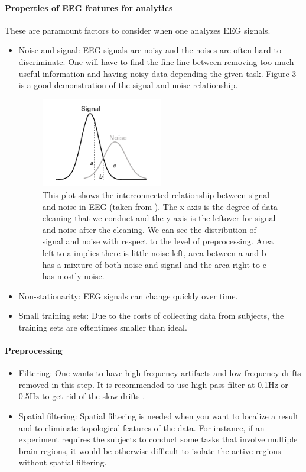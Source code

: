 \documentclass[a4paper,11pt,oneside]{article}
\begin{document}
\paragraph{Properties of EEG features for analytics} 
These are paramount factors to consider when one analyzes EEG signals.
\begin{itemize}
	\item Noise and signal: EEG signals are noisy and the noises are often hard to discriminate. One will have to find the fine line between removing too much useful information and having noisy data depending the given task. Figure 3 is a good demonstration of the signal and noise relationship.
	\begin{figure}[h]
		\centering
		\includegraphics[width=0.5\textwidth]{img/noise}
		\caption{This plot shows the interconnected relationship between signal and noise in EEG (taken from \cite{cohen2014analyzing}). The x-axis is the degree of data cleaning that we conduct and the y-axis is the leftover for signal and noise after the cleaning. We can see the distribution of signal and noise with respect to the level of preprocessing. Area left to a implies there is little noise left, area between a and b has a mixture of both noise and signal and the area right to c has mostly noise.}
	\end{figure}
	\item Non-stationarity: EEG signals can change quickly over time.
	\item Small training sets: Due to the costs of collecting data from subjects, the training sets are oftentimes 
	smaller than ideal.
\end{itemize}

\paragraph{Preprocessing}
\begin{itemize}
	\item Filtering: One wants to have high-frequency artifacts and low-frequency drifts removed in this step.
	It is recommended to use high-pass filter at 0.1Hz or 0.5Hz to get rid of the slow drifts \cite{cohen2014analyzing}.
	\item Spatial filtering: Spatial filtering is needed when you want to localize a result and to eliminate topological features of the data. For instance, if an experiment requires the subjects to conduct some tasks that involve multiple brain regions, it would be otherwise difficult to isolate the active regions without spatial filtering. \cite{cohen2014analyzing}
\end{itemize}
\end{document}
